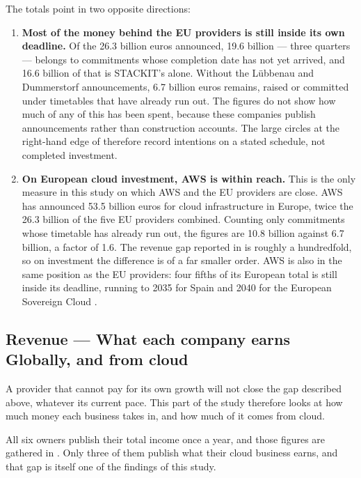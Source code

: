 The totals point in two opposite directions:

\begin{enumerate}
  \item \textbf{Most of the money behind the \acs{EU} providers is still inside its
  own deadline.} Of the 26.3 billion euros announced, 19.6 billion --- three
  quarters --- belongs to commitments whose completion date has not yet arrived,
  and 16.6 billion of that is STACKIT's alone. Without the L\"ubbenau and
  Dummerstorf announcements, 6.7 billion euros remains, raised or committed under
  timetables that have already run out. The figures do not show how much of any of
  this has been spent, because these companies publish announcements rather than
  construction accounts. The large circles at the right-hand edge of
   therefore record intentions on a stated schedule,
  not completed investment.

  \item \textbf{On European cloud investment, AWS is within reach.} This is the
  only measure in this study on which \acs{AWS} and the \acs{EU} providers are
  close. \acs{AWS} has announced 53.5 billion euros for cloud infrastructure in
  Europe, twice the 26.3 billion of the five \acs{EU} providers combined. Counting
  only commitments whose timetable has already run out, the figures are 10.8
  billion against 6.7 billion, a factor of 1.6. The revenue gap reported in
   is roughly a hundredfold, so on investment the
  difference is of a far smaller order. \acs{AWS} is also in the same position as
  the \acs{EU} providers: four fifths of its European total is still inside its
  deadline, running to 2035 for Spain and 2040 for the European Sovereign Cloud
  \cite{AWS_SovereignCloud_Investment_2024,Amazon_Spain_Investment_2026}.
\end{enumerate}


\subsection{Revenue --- What each company earns Globally, and from cloud}

A provider that cannot pay for its own growth will not close the gap described
above, whatever its current pace. This part of the study therefore looks at how much
money each business takes in, and how much of it comes from cloud.

All six owners publish their total income once a year, and those figures are
gathered in . Only three of them publish what their cloud
business earns, and that gap is itself one of the findings of this study.

